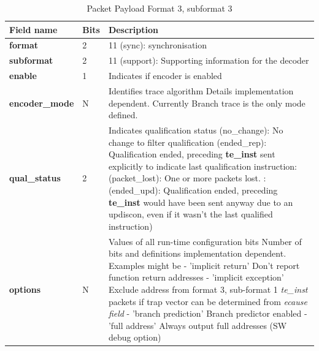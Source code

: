 \begin{table}[htp]
  \centering
  \caption{Packet Payload Format 3, subformat 3}
  \label{tab:te_inst3}
  \begin{tabulary}{\textwidth}{|l|p{35mm}|p{80mm}|}
    \hline
     {\bf Field name} & {\bf Bits} & {\bf Description} \\
     \hline
     \textbf{format} & 2 & 11 (sync): synchronisation\\
     \hline
     \textbf{subformat}  & 2 & 11 (support): Supporting information for the decoder \\
     \hline
     \textbf{enable} & 1 & Indicates if encoder is enabled\\
     \hline
     \textbf{encoder\_mode} & N & Identifies trace algorithm\newline
       Details implementation dependent.  Currently Branch trace is the only mode defined.\\
     \hline
     \textbf{qual\_status} & 2 & Indicates qualification status (no\_change): No change to filter qualification  (ended\_rep): Qualification ended, preceding \textbf{te\_inst} sent explicitly to indicate last qualification instruction: (packet\_lost): One or more packets lost. : (ended\_upd): Qualification ended, preceding \textbf{te\_inst} would have been sent anyway due to an updiscon, even if it wasn't the last qualified instruction)\\
     \hline
     \textbf{options} & N & Values of all run-time configuration bits\newline
       Number of bits and definitions implementation dependent.  Examples might be\newline
       - 'implicit return' Don't report function return addresses \newline
       - 'implicit exception' Exclude address from format 3, sub-format 1 \textit{te\_inst} packets if trap vector can be determined from \textit{ecause field}\newline
       - 'branch prediction' Branch predictor enabled\newline
       - 'full address' Always output full addresses (SW debug option)\\
       \hline
  \end{tabulary}
\end{table}

